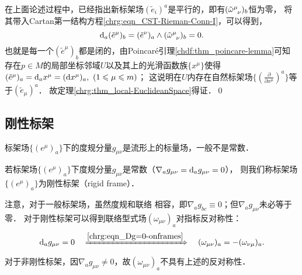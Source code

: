 在上面论述过程中，已经指出新标架场$(\tilde{e}_i)^a$是平行的，即有$(\tilde{\omega} _{\hphantom{\mu} \nu}^\mu)_b$恒为零，
将其带入Cartan第一结构方程\eqref{chrg:eqn_CST-Rieman-Conn-I}，可以得到，
\begin{equation}
    {\rm d}_a (\tilde{e}^\mu)_b =(\tilde{e}^\nu)_a \wedge (\tilde{\omega} _{\hphantom{\mu} \nu}^\mu)_b =0 .
\end{equation}
也就是每一个$(\tilde{e}^\mu)_b$都是闭的，由Poincar\'{e}引理\ref{chdf:thm_poincare-lemma}可知
存在$p\in M$的局部坐标邻域$U$以及其上的光滑函数族$\{x^\mu\}$使得
$ (\tilde{e}^\mu)_a = {\rm d}_a x^\mu = ({\rm d} x^\mu)_a, \ (1\leqslant \mu \leqslant m) $；
这说明在$U$内存在自然标架场$\{(\frac{\partial }{\partial x^\mu})^a\}$等于$(\tilde{e}_\mu)^{a}$．
故定理\ref{chrg:thm_local-EuclideanSpace}得证．\qed



\subsection{刚性标架}\label{chrg:sec_rigid-frame}
标架场$\{(e^\mu)_{a}\}$下的度规分量$g_{\mu\nu}$是流形上的标量场，一般不是常数．
\begin{definition}\label{chrg:def_rigid-frame}
    若标架场$\{(e^\mu)_{a}\}$下度规分量$g_{\mu\nu}$是常数（$\nabla_a g_{\mu\nu}={\rm d}_a g_{\mu\nu}=0$），
    则我们称标架场$\{(e^\mu)_{a}\}$为{\heiti 刚性标架}（rigid frame）．
\end{definition}
注意，对于一般标架场，虽然度规和联络
相容，即$\nabla_a g_{bc}\equiv0$；但$\nabla_a g_{\mu\nu}$未必等于零．
对于刚性标架可以得到联络型式场$(\omega _{\mu\nu})_{a}$对指标反对称性：
\begin{equation}\label{chrg:eqn_omega-anti}
    {\rm d}_a g_{\mu\nu}=0 \quad \xRightarrow{\ref{chrg:eqn_Dg=0-onframes}}\quad
    (\omega _{\mu\nu})_{a} = -(\omega _{\nu\mu})_{a} .
\end{equation}
对于非刚性标架，因$\nabla_a g_{\mu\nu}\neq 0$，故$(\omega _{\mu\nu})_{a}$不具有上述的反对称性．


